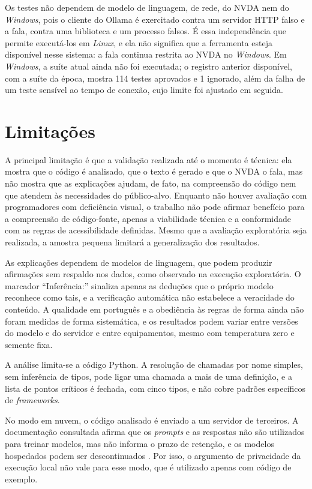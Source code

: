 \documentclass[
    12pt,                   %
    openright,              %
    oneside,                %
    a4paper,                %
    sumario=tradicional,    %
    english,                %
    brazil,                 %
    ]{abntex2}
\begin{document}
Os testes não dependem de modelo de linguagem, de rede, do NVDA nem do \textit{Windows}, pois o cliente do Ollama é exercitado contra um servidor HTTP falso e a fala, contra uma biblioteca e um processo falsos. É essa independência que permite executá-los em \textit{Linux}, e ela não significa que a ferramenta esteja disponível nesse sistema: a fala continua restrita ao NVDA no \textit{Windows}. Em \textit{Windows}, a suíte atual ainda não foi executada; o registro anterior disponível, com a suíte da época, mostra 114 testes aprovados e 1 ignorado, além da falha de um teste sensível ao tempo de conexão, cujo limite foi ajustado em seguida.

\section{Limitações}\label{sec:limitacoes}

A principal limitação é que a validação realizada até o momento é técnica: ela mostra que o código é analisado, que o texto é gerado e que o NVDA o fala, mas não mostra que as explicações ajudam, de fato, na compreensão do código nem que atendem às necessidades do público-alvo. Enquanto não houver avaliação com programadores com deficiência visual, o trabalho não pode afirmar benefício para a compreensão de código-fonte, apenas a viabilidade técnica e a conformidade com as regras de acessibilidade definidas. Mesmo que a avaliação exploratória seja realizada, a amostra pequena limitará a generalização dos resultados.

As explicações dependem de modelos de linguagem, que podem produzir afirmações sem respaldo nos dados, como observado na execução exploratória. O marcador \enquote{Inferência:} sinaliza apenas as deduções que o próprio modelo reconhece como tais, e a verificação automática não estabelece a veracidade do conteúdo. A qualidade em português e a obediência às regras de forma ainda não foram medidas de forma sistemática, e os resultados podem variar entre versões do modelo e do servidor e entre equipamentos, mesmo com temperatura zero e semente fixa.

A análise limita-se a código Python. A resolução de chamadas por nome simples, sem inferência de tipos, pode ligar uma chamada a mais de uma definição, e a lista de pontos críticos é fechada, com cinco tipos, e não cobre padrões específicos de \textit{frameworks}.

No modo em nuvem, o código analisado é enviado a um servidor de terceiros. A documentação consultada afirma que os \textit{prompts} e as respostas não são utilizados para treinar modelos, mas não informa o prazo de retenção, e os modelos hospedados podem ser descontinuados \cite{ollama2026nuvem}. Por isso, o argumento de privacidade da execução local não vale para esse modo, que é utilizado apenas com código de exemplo.
\end{document}
